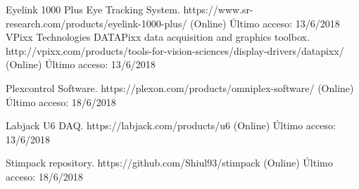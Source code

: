 \documentclass[conference]{IEEEtran}
\begin{document}
\begin{thebibliography}{00}
 Eyelink 1000 Plus Eye Tracking System. https://www.sr-research.com/products/eyelink-1000-plus/ (Online) Último acceso: 13/6/2018
 VPixx Technologies DATAPixx data acquisition and graphics toolbox. http://vpixx.com/products/tools-for-vision-sciences/display-drivers/datapixx/  (Online) Último acceso: 13/6/2018

 Plexcontrol Software. https://plexon.com/products/omniplex-software/ (Online) Último acceso: 18/6/2018

 Labjack U6 DAQ. https://labjack.com/products/u6 (Online) Último acceso: 13/6/2018




 Stimpack repository. https://github.com/Shiul93/stimpack (Online) Último acceso: 18/6/2018

\end{thebibliography}
\vspace{12pt}
\end{document}

